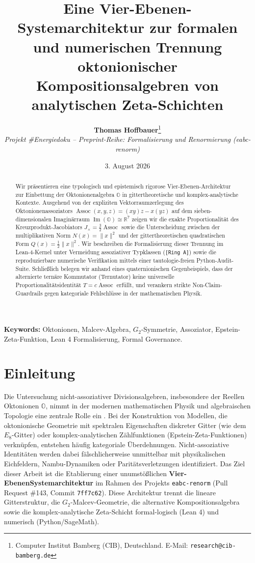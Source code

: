 \documentclass[11pt,a4paper]{article}
\title{\textbf{Eine Vier-Ebenen-Systemarchitektur zur formalen und numerischen Trennung oktonionischer Kompositionsalgebren von analytischen Zeta-Schichten}}
\author{%
	\textbf{Thomas Hoffbauer}\thanks{Computer Institut Bamberg (CIB), Deutschland. E-Mail: \texttt{research@cib-bamberg.de}} \\[2mm]
	\small\textit{Projekt \#Energiedoku -- Preprint-Reihe: Formalisierung und Renormierung (eabc-renorm)}
}
\date{3. August 2026}
\theoremstyle{definition}
\newcommand{\Oalg}{\mathbb{O}}
\newcommand{\ImO}{\operatorname{Im}(\mathbb{O})}
\newcommand{\Assoc}{\operatorname{Assoc}}
\begin{document}
	\maketitle
	\begin{abstract}
		Wir präsentieren eine typologisch und epistemisch rigorose Vier-Ebenen-Architektur zur Einbettung der Oktonionenalgebra $\Oalg$ in gittertheoretische und komplex-analytische Kontexte. Ausgehend von der expliziten Vektorraumzerlegung des Oktonionenassoziators $\Assoc(x,y,z) = (xy)z - x(yz)$ auf dem sieben-dimensionalen Imaginärraum $\ImO \cong \mathbb{R}^7$ zeigen wir die exakte Proportionalität des Kreuzprodukt-Jacobiators $J_\times = \frac{3}{2}\Assoc$ sowie die Unterscheidung zwischen der multiplikativen Norm $N(x) = \|x\|^2$ und der gittertheoretischen quadratischen Form $Q(x) = \frac{1}{2}\|x\|^2$. Wir beschreiben die Formalisierung dieser Trennung im Lean-4-Kernel unter Vermeidung assoziativer Typklassen (\texttt{[Ring A]}) sowie die reproduzierbare numerische Verifikation mittels einer tautologie-freien Python-Audit-Suite. Schließlich belegen wir anhand eines quaternionischen Gegenbeispiels, dass der alternierte ternäre Kommutator (Ternutator) keine universelle Proportionalitätsidentität $T = c \Assoc$ erfüllt, und verankern strikte Non-Claim-Guardrails gegen kategoriale Fehlschlüsse in der mathematischen Physik.
	\end{abstract}
	\noindent\textbf{Keywords:} Oktonionen, Malcev-Algebra, $G_2$-Symmetrie, Assoziator, Epstein-Zeta-Funktion, Lean 4 Formalisierung, Formal Governance.
	\section{Einleitung}
	Die Untersuchung nicht-assoziativer Divisionsalgebren, insbesondere der Reellen Oktonionen $\Oalg$, nimmt in der modernen mathematischen Physik und algebraischen Topologie eine zentrale Rolle ein \cite{baez2002octonions}. Bei der Konstruktion von Modellen, die oktonionische Geometrie mit spektralen Eigenschaften diskreter Gitter (wie dem $E_8$-Gitter) oder komplex-analytischen Zählfunktionen (Epstein-Zeta-Funktionen) verknüpfen, entstehen häufig kategoriale Überdehnungen. Nicht-assoziative Identitäten werden dabei fälschlicherweise unmittelbar mit physikalischen Eichfeldern, Nambu-Dynamiken oder Paritätsverletzungen identifiziert.
	Das Ziel dieser Arbeit ist die Etablierung einer unumstößlichen
	\textbf{Vier-Ebenen\-System\-architektur} im Rahmen des Projekts
	\texttt{eabc-renorm} (Pull Request \#143, Commit \texttt{7ff7c62}). Diese Architektur trennt die lineare Gitterstruktur, die $G_2$-Malcev-Geometrie, die alternative Kompositionsalgebra sowie die komplex-analytische Zeta-Schicht formal-logisch (Lean 4) und numerisch (Python/SageMath).
\end{document}
